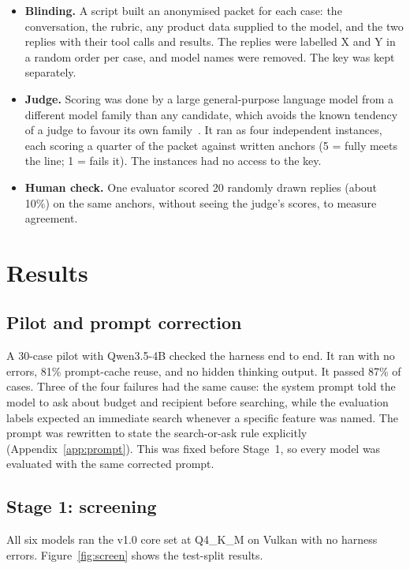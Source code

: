 \documentclass[11pt,a4paper]{article}
\begin{document}
\begin{itemize}
  \item \textbf{Blinding.} A script built an anonymised packet for each case: the conversation, the rubric, any product
        data supplied to the model, and the two replies with their tool calls and results. The replies were labelled
        X and Y in a random order per case, and model names were removed. The key was kept separately.
  \item \textbf{Judge.} Scoring was done by a large general-purpose language model from a different model family than
        any candidate, which avoids the known tendency of a judge to favour its own family~\cite{llmjudge}. It ran as
        four independent instances, each scoring a quarter of the packet against written anchors (5 = fully meets the
        line; 1 = fails it). The instances had no access to the key.
  \item \textbf{Human check.} One evaluator scored 20 randomly drawn replies (about 10\%) on the same anchors, without
        seeing the judge's scores, to measure agreement.
\end{itemize}

\section{Results}\label{sec:results}

\subsection{Pilot and prompt correction}\label{sec:pilot}
A 30-case pilot with Qwen3.5-4B checked the harness end to end. It ran with no errors, 81\% prompt-cache reuse, and no
hidden thinking output. It passed 87\% of cases. Three of the four failures had the same cause: the system prompt told
the model to ask about budget and recipient before searching, while the evaluation labels expected an immediate search
whenever a specific feature was named. The prompt was rewritten to state the search-or-ask rule explicitly
(Appendix~\ref{app:prompt}). This was fixed before Stage~1, so every model was evaluated with the same corrected
prompt.

\subsection{Stage 1: screening}\label{sec:stage1}
All six models ran the v1.0 core set at Q4\_K\_M on Vulkan with no harness errors. Figure~\ref{fig:screen} shows the
test-split results.
\end{document}
